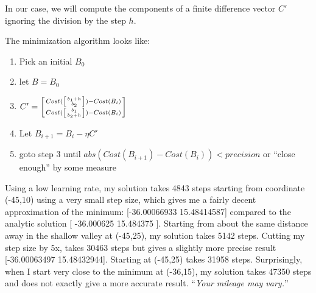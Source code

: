 \begin{fullwidth}
\noindent In our case, we will compute the components of a finite difference vector $C'$ ignoring the division by the step $h$.

The minimization algorithm looks like:

\begin{enumerate}
\item Pick an initial $B_0$
\item let $B = B_0$
\item $C' = \left[ Cost(\left[ b_1+h \above 0pt{b_2} \right]) - Cost(B_i) \above 0pt Cost(\left[ b_1 \above 0pt{b_2+h} \right]) - Cost(B_i) \right]$
\item Let $B_{i+1} = B_i - \eta C'$
\item goto step 3 until $abs(Cost(B_{i+1})-Cost(B_i)) < precision$ or ``close enough'' by some measure
\end{enumerate}

Using a low learning rate, my solution takes 4843 steps starting from coordinate (-45,10) using a very small step size, which gives me a fairly decent approximation of the minimum: [-36.00066933  15.48414587] compared to the analytic solution [ -36.000625 15.484375 ]. Starting from about the same distance away in the shallow valley at (-45,25), my solution takes 5142 steps. Cutting my step size by 5x, takes 30463 steps but gives a slightly more precise result [-36.00063497  15.48432944]. Starting at (-45,25) takes 31958 steps. Surprisingly, when I start very close to the minimum at (-36,15), my solution takes 47350 steps and does not exactly give a more accurate result. ``{\em Your mileage may vary.}''

\noindent {}


\end{fullwidth}
